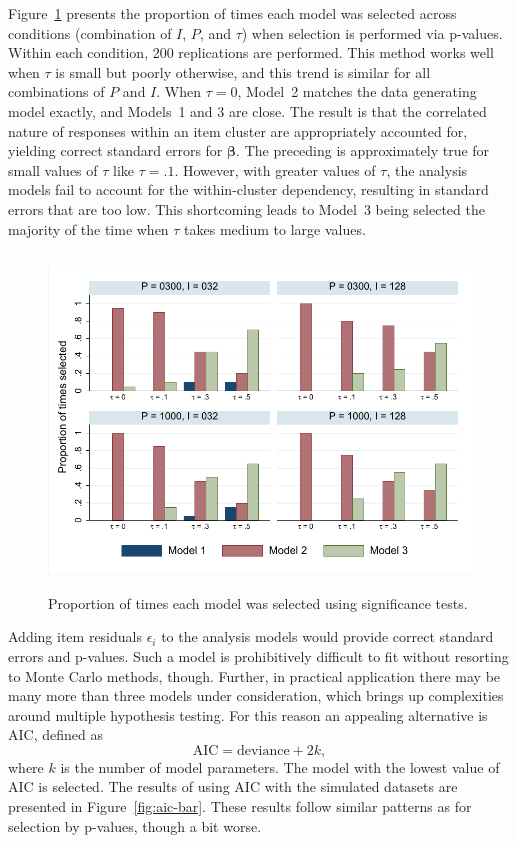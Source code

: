 \documentclass[12pt, letterpaper]{article}
\begin{document}
Figure~\ref{fig:pcheck-bar} presents the proportion of times each model was selected across conditions (combination of $I$, $P$, and $\tau$) when selection is performed via p-values. Within each condition, 200 replications are performed. This method works well when $\tau$ is small but poorly otherwise, and this trend is similar for all combinations of $P$ and $I$. When $\tau = 0$, Model~2 matches the data generating model exactly, and Models~1 and 3 are close. The result is that the correlated nature of responses within an item cluster are appropriately accounted for, yielding correct standard errors for $\mathbf{\beta}$. The preceding is approximately true for small values of $\tau$ like $\tau = .1$. However, with greater values of $\tau$, the analysis models fail to account for the within-cluster dependency, resulting in standard errors that are too low. This shortcoming leads to Model~3 being selected the majority of the time when $\tau$ takes medium to large values.

\begin{figure}[htbp]
	\centering
	\includegraphics[height=3.5in, trim = 1mm 1mm 1mm 1mm, clip=true]
	{chapter_2/figs/p_pcheck.pdf}
	\caption{Proportion of times each model was selected using significance tests.}
	\label{fig:pcheck-bar}
\end{figure}

Adding item residuals $\epsilon_i$ to the analysis models would provide correct standard errors and p-values. Such a model is prohibitively difficult to fit without resorting to Monte Carlo methods, though. Further, in practical application there may be many more than three models under consideration, which brings up complexities around multiple hypothesis testing. For this reason an appealing alternative is AIC, defined as
\begin{equation}
	\mathrm{AIC} = \mathrm{deviance} + 2k
,\end{equation}
where $k$ is the number of model parameters. The model with the lowest value of AIC is selected. The results of using AIC with the simulated datasets are presented in Figure~\ref{fig:aic-bar}. These results follow similar patterns as for selection by p-values, though a bit worse.
\end{document}
